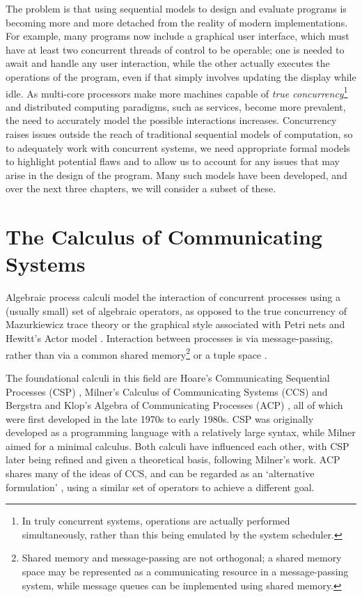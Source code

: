 The problem is that using sequential models to design and evaluate
programs is becoming more and more detached from the reality of modern
implementations.  For example, many programs now include a graphical
user interface, which must have at least two concurrent threads of
control to be operable; one is needed to await and handle any user
interaction, while the other actually executes the operations of the
program, even if that simply involves updating the display while idle.
As multi-core processors make more machines capable of \emph{true
  concurrency}\footnote{In truly concurrent systems, operations are
  actually performed simultaneously, rather than this being emulated
  by the system scheduler.} and distributed computing paradigms, such
as services, become more prevalent, the need to accurately model the
possible interactions increases.  Concurrency raises issues outside
the reach of traditional sequential models of computation, so to
adequately work with concurrent systems, we need appropriate formal
models to highlight potential flaws and to allow us to account for any
issues that may arise in the design of the program.  Many such models
have been developed, and over the next three chapters, we will
consider a subset of these.

\section{The Calculus of Communicating Systems}
\label{ccs}

Algebraic process calculi model the interaction of concurrent
processes using a (usually small) set of algebraic operators, as
opposed to the true concurrency of Mazurkiewicz trace theory
\cite*{maz:trace} or the graphical style associated with Petri nets
\cite*{petri:phd} and Hewitt's Actor model \cite*{hewitt:actor}.
Interaction between processes is via message-passing, rather than via
a common shared memory\footnote{Shared memory and message-passing are
  not orthogonal; a shared memory space may be represented as a
  communicating resource in a message-passing system, while message
  queues can be implemented using shared memory.} or a tuple space
\cite*{linda}.

The foundational calculi in this field are Hoare's Communicating
Sequential Processes (CSP) \cite*{hoare:csp78}, Milner's Calculus of
Communicating Systems (CCS) \cite*{milner:ccs} and Bergstra and Klop's
Algebra of Communicating Processes (ACP) \cite*{acp}, all of which
were first developed in the late 1970s to early 1980s.  CSP was
originally developed as a programming language with a relatively large
syntax, while Milner aimed for a minimal calculus.  Both calculi have
influenced each other, with CSP later being refined and given a
theoretical basis, following Milner's work.  ACP shares many of the
ideas of CCS, and can be regarded as an `alternative formulation'
\cite{acp}, using a similar set of operators to achieve a different
goal.

